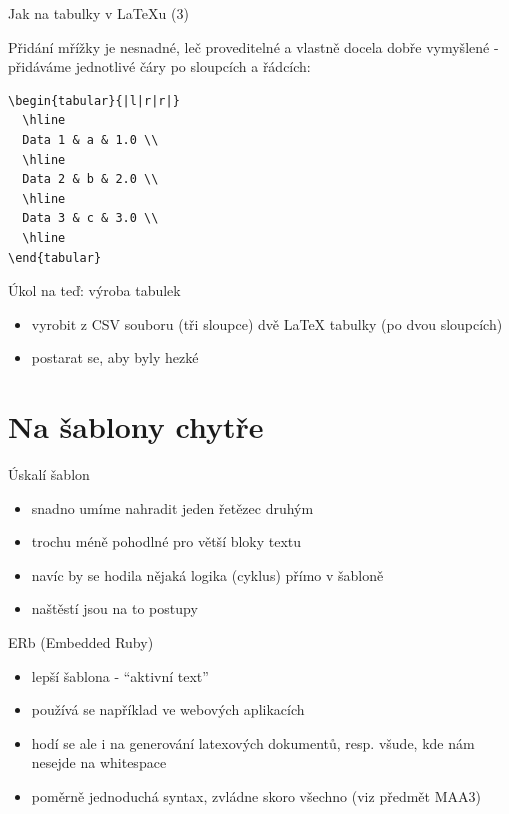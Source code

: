 \documentclass{beamer}
\begin{document}
\begin{frame}[fragile]{Jak na tabulky v LaTeXu (3)}
  \begin{block}{ }
    Přidání mřížky je nesnadné, leč proveditelné a vlastně docela dobře vymyšlené - přidáváme jednotlivé čáry po sloupcích a řádcích:
    \scriptsize
    \begin{verbatim}
\begin{tabular}{|l|r|r|}
  \hline
  Data 1 & a & 1.0 \\
  \hline
  Data 2 & b & 2.0 \\
  \hline
  Data 3 & c & 3.0 \\
  \hline
\end{tabular}
    \end{verbatim}
  \end{block}
\end{frame}

\begin{frame}{Úkol na teď: výroba tabulek}
  \begin{itemize}
    \item vyrobit z CSV souboru (tři sloupce) dvě LaTeX tabulky (po dvou sloupcích)
    \item postarat se, aby byly hezké
  \end{itemize}
\end{frame}

% 
% 
% 
% 


\section{Na šablony chytře}

\begin{frame}{Úskalí šablon}
  \begin{itemize}
    \item snadno umíme nahradit jeden řetězec druhým
    \item trochu méně pohodlné pro větší bloky textu
    \item navíc by se hodila nějaká logika (cyklus) přímo v šabloně
    \item naštěstí jsou na to postupy
  \end{itemize}
\end{frame}

\begin{frame}{ERb (Embedded Ruby)}
  \begin{itemize}
    \item lepší šablona - ``aktivní text''
    \item používá se například ve webových aplikacích
    \item hodí se ale i na generování latexových dokumentů, resp. všude, kde nám nesejde na whitespace
    \item poměrně jednoduchá syntax, zvládne skoro všechno (viz předmět MAA3)
  \end{itemize}
\end{frame}
\end{document}

